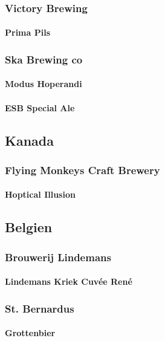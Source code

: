 \documentclass[11pt]{article}
\begin{document}
\subsubsection{Victory Brewing}
\label{sec:org22478d0}
\paragraph{Prima Pils}
\label{sec:org2337a9a}
\subsubsection{Ska Brewing co}
\label{sec:org1c4da87}
\paragraph{Modus Hoperandi}
\label{sec:orgd0e9291}
\paragraph{ESB Special Ale}
\label{sec:orga2927be}
\subsection{Kanada}
\label{sec:orgdf9cbb6}
\subsubsection{Flying Monkeys Craft Brewery}
\label{sec:org4366ab5}
\paragraph{Hoptical Illusion}
\label{sec:org266a7f9}
\subsection{Belgien}
\label{sec:orgb30f19f}
\subsubsection{Brouwerij Lindemans}
\label{sec:orgebdb841}
\paragraph{Lindemans Kriek Cuvée René}
\label{sec:orga6b22ba}
\subsubsection{St. Bernardus}
\label{sec:org1c1666c}
\paragraph{Grottenbier}
\label{sec:orgcfb2089}
\end{document}
